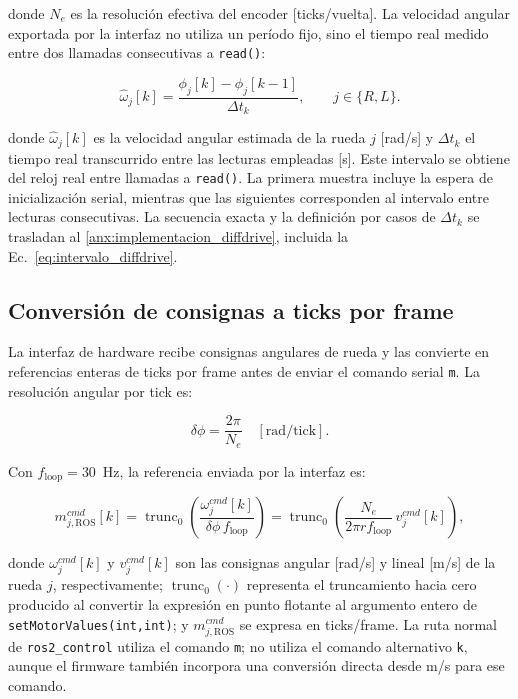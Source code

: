 \noindent donde $N_e$ es la resolución efectiva del encoder [ticks/vuelta]. La velocidad angular exportada por la interfaz no utiliza un período fijo, sino el tiempo real medido entre dos llamadas consecutivas a \texttt{read()}:

\begin{equation}
\widehat{\omega}_j[k]
=
\frac{\phi_j[k]-\phi_j[k-1]}{\Delta t_k},
\qquad j\in\{R,L\}.
\label{eq:w_ruedas}
\end{equation}

\noindent donde $\widehat{\omega}_j[k]$ es la velocidad angular estimada de la rueda $j$ [rad/s] y $\Delta t_k$ el tiempo real transcurrido entre las lecturas empleadas [s]. Este intervalo se obtiene del reloj real entre llamadas a \texttt{read()}. La primera muestra incluye la espera de inicialización serial, mientras que las siguientes corresponden al intervalo entre lecturas consecutivas. La secuencia exacta y la definición por casos de $\Delta t_k$ se trasladan al \ref{anx:implementacion_diffdrive}, incluida la Ec.~\eqref{eq:intervalo_diffdrive}.

\subsection{Conversión de consignas a ticks por frame}

La interfaz de hardware recibe consignas angulares de rueda y las convierte en referencias enteras de ticks por frame antes de enviar el comando serial \texttt{m}. La resolución angular por tick es:

\begin{equation}
\delta\phi
=
\frac{2\pi}{N_e}
\quad [\mathrm{rad/tick}].
\label{eq:radianes_por_tick}
\end{equation}

Con $f_{\mathrm{loop}}=30$~Hz, la referencia enviada por la interfaz es:

\begin{equation}
m_{j,\mathrm{ROS}}^{cmd}[k]
=
\operatorname{trunc}_{0}
\left(
\frac{\omega_j^{cmd}[k]}{\delta\phi\,f_{\mathrm{loop}}}
\right)
=
\operatorname{trunc}_{0}
\left(
\frac{N_e}{2\pi r f_{\mathrm{loop}}}
\,v_j^{cmd}[k]
\right),
\label{eq:mps_to_ticks}
\end{equation}

\noindent donde $\omega_j^{cmd}[k]$ y $v_j^{cmd}[k]$ son las consignas angular [rad/s] y lineal [m/s] de la rueda $j$, respectivamente; $\operatorname{trunc}_{0}(\cdot)$ representa el truncamiento hacia cero producido al convertir la expresión en punto flotante al argumento entero de \texttt{setMotorValues(int,int)}; y $m_{j,\mathrm{ROS}}^{cmd}$ se expresa en ticks/frame. La ruta normal de \texttt{ros2\_control} utiliza el comando \texttt{m}; no utiliza el comando alternativo \texttt{k}, aunque el firmware también incorpora una conversión directa desde m/s para ese comando.

